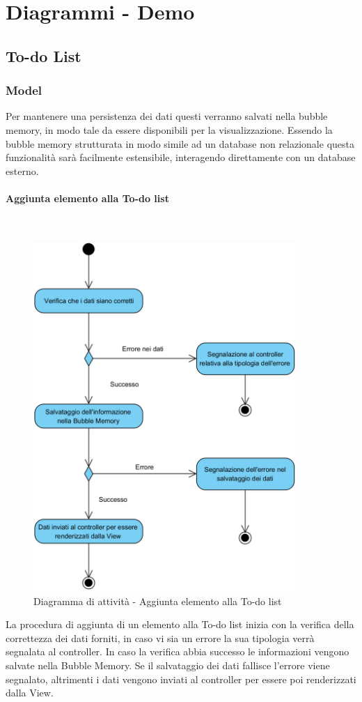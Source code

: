 \section{Diagrammi - Demo}\label{DiagrammiDemo}

\subsection{To-do List}

\subsubsection{Model}
Per mantenere una persistenza dei dati questi verranno salvati nella bubble memory, in modo tale da essere disponibili per la visualizzazione. Essendo la bubble memory strutturata in modo simile ad un database non relazionale questa funzionalità sarà facilmente estensibile, interagendo direttamente con un database esterno.

\paragraph{Aggiunta elemento alla To-do list}\mbox{}\\
\nopagebreak
\begin{figure}[H]
	\centering
	\includegraphics[width=10cm]{../../documenti/SpecificaTecnica/diagrammi_img/attivita/addelementtodolist.png}
	\caption{Diagramma di attività - Aggiunta elemento alla To-do list}
\end{figure}
La procedura di aggiunta di un elemento alla To-do list inizia con la verifica della correttezza dei dati forniti, in caso vi sia un errore la sua tipologia verrà segnalata al controller. In caso la verifica abbia successo le informazioni vengono salvate nella Bubble Memory. Se il salvataggio dei dati fallisce l'errore viene segnalato, altrimenti i dati vengono inviati al controller per essere poi renderizzati dalla View.

